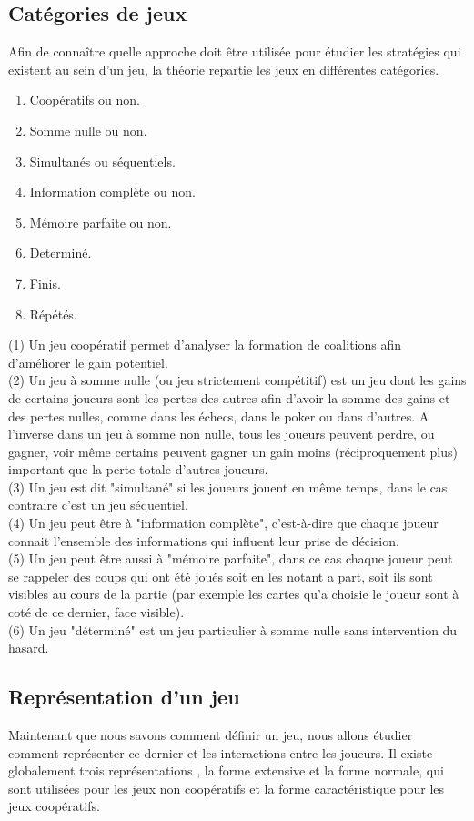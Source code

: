 \documentclass[a4paper, 12pt, french]{article}
\begin{document}
	\subsection{Catégories de jeux}
	Afin de connaître quelle approche doit être utilisée pour étudier les stratégies qui existent au sein d'un jeu,
	la théorie repartie les jeux en différentes catégories\cite{wiki_typo_theorie_jeux}.
	\begin{enumerate}
		\item Coopératifs ou non.
		\item Somme nulle ou non.
		\item Simultanés ou séquentiels.
		\item Information complète ou non.
		\item Mémoire parfaite ou non.
		\item Determiné.
		\item Finis.
		\item Répétés.
	\end{enumerate}
	(1) Un jeu coopératif permet d'analyser la formation de coalitions afin d'améliorer le gain potentiel. \\
	(2) Un jeu à somme nulle (ou jeu strictement compétitif) est un jeu dont les gains de certains joueurs
	sont les pertes des autres afin d'avoir la somme des gains et des pertes nulles, comme dans les échecs,
	dans le poker ou dans d'autres. A l'inverse dans un jeu à somme non nulle, tous les joueurs peuvent perdre,
	ou gagner, voir même certains peuvent gagner un gain moins (réciproquement plus) important que la perte totale
	d'autres joueurs.\\
	(3) Un jeu est dit "simultané" si les joueurs jouent en même temps, dans le cas contraire c'est un jeu séquentiel.\\
	(4) Un jeu peut être à "information complète", c'est-à-dire que chaque joueur connait l'ensemble des informations
	qui influent leur prise de décision.\\
	(5) Un jeu peut être aussi à "mémoire parfaite", dans ce cas chaque joueur peut se rappeler des coups qui ont été
	joués soit en les notant a part, soit ils sont visibles au cours de la partie (par exemple les cartes qu'a choisie
	le joueur sont à coté de ce dernier, face visible).\\
	(6) Un jeu "déterminé" est un jeu particulier à somme nulle sans intervention du hasard.

	\subsection{Représentation d'un jeu}
	Maintenant que nous savons comment définir un jeu, nous allons étudier comment représenter ce dernier et les
	interactions entre les joueurs. Il existe globalement trois représentations\cite{wiki_representation_theorie_jeux}
	, la forme extensive et la forme normale, qui sont utilisées pour les jeux non coopératifs et
	la forme caractéristique pour les jeux coopératifs.
\end{document}
